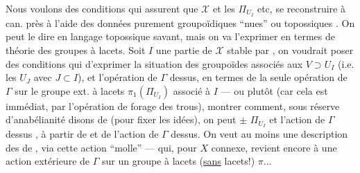Nous voulons des conditions qui assurent que $\mathcal{X}$ et les $\Pi_{U_I}$  etc,  se reconstruire à   can. près à l'aide des données purement groupoïdiques ``nues'' ou topossiques  .  On peut le dire en langage topossique savant, mais on va l'exprimer en termes de théorie des groupes à lacets. Soit $I$ une partie de $\mathcal{X}$ stable par , on voudrait poser des conditions qui   d'exprimer  la situation des groupoïdes  associés aux $V\supset U_I$ (i.e. les $U_J$ avec $J\subset I$),  et l'opération de $\Gamma$ dessus, en termes de la  seule opération de $\Gamma$ sur le groupe ext. à lacets  $\pi_1(\Pi_{U_I})$ associé à $I$ ---
\margin{\unsure{$\rightsquigarrow$|$\longrightarrow$}}
ou plutôt (car cela est immédiat, par l'opération de forage des trous),  montrer comment,
sous réserve d'anabélianité \unsure{$\zeta$|$\xi$} disons de  (pour fixer les idées), on peut $\pm$  $\Pi_{U_I}$ et l'action de $\Gamma$ dessus ,
à partir de   et de l'action de $\Gamma$ dessus.
On veut au moins une description  des  de ,  via
cette action ``molle'' --- qui, pour $X$ connexe, revient encore à une action extérieure de $\Gamma$ sur un groupe à lacets (\uline{sans} lacets!) $\pi$...

